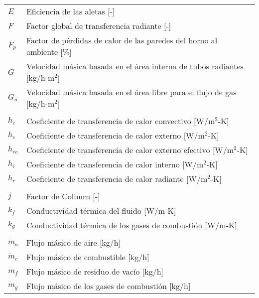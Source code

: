 \begin{tabular}{ll}
$E$   & Eficiencia de las aletas [-]\\
$F$   & Factor global de transferencia radiante [-]\\
$F_p$ & Factor de pérdidas de calor de las paredes del horno al ambiente [\%]\\
$G$   & Velocidad másica basada en el área interna de tubos radiantes [kg/h-m$^2$]\\
$G_n$ & Velocidad másica basada en el área libre para el flujo de gas [kg/h-m$^2$]\\
\\
$h_{c}$ & Coeficiente de transferencia de calor convectivo [W/m$^2$-K]\\
$h_{e}$ & Coeficiente de transferencia de calor externo [W/m$^2$-K]\\
$h_{ee}$& Coeficiente de transferencia de calor externo efectivo [W/m$^2$-K]\\
$h_{i}$ & Coeficiente de transferencia de calor interno [W/m$^2$-K]\\
$h_{r}$ & Coeficiente de transferencia de calor radiante [W/m$^2$-K]\\
\\
$j$     & Factor de Colburn [-] \\
$k_f$   & Conductividad térmica del fluido [W/m-K] \\
$k_g$   & Conductividad térmica de los gases de combustión [W/m-K] \\
\\
$\dot m_a$  & Flujo másico de aire [kg/h] \\
$\dot m_c$  & Flujo másico de combustible [kg/h] \\
$\dot m_f$  & Flujo másico de residuo de vacío [kg/h] \\
$\dot m_g$  & Flujo másico de los gases de combustión [kg/h] \\
\end{tabular}

